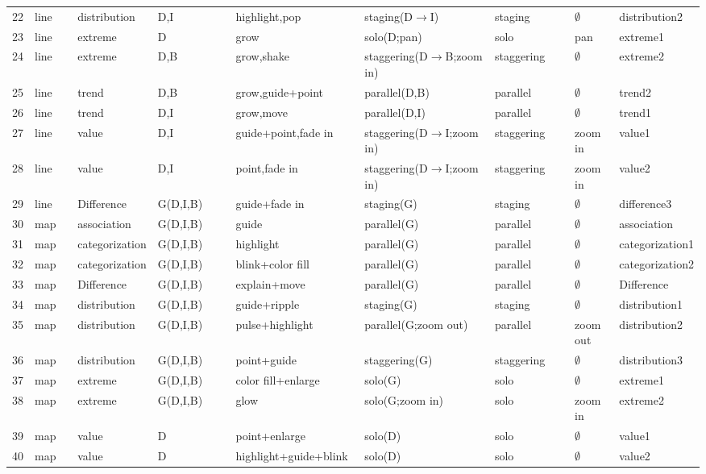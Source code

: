 \begin{landscape}
\begin{longtable}{p{0.035\linewidth}p{0.075\linewidth}p{0.09\linewidth}p{0.13\linewidth}p{0.19\linewidth}p{0.22\linewidth}p{0.13\linewidth}p{0.075\linewidth}p{0.08\linewidth}}
22 & line & distribution & D,I & highlight,pop & staging(D$\rightarrow$I) & staging & $\emptyset$ & distribution2 \\
23 & line & extreme & D & grow & solo(D;pan) & solo & pan & extreme1 \\
24 & line & extreme & D,B & grow,shake & staggering(D$\rightarrow$B;zoom in) & staggering & $\emptyset$ & extreme2 \\
25 & line & trend & D,B & grow,guide+point & parallel(D,B) & parallel & $\emptyset$ & trend2 \\
26 & line & trend & D,I & grow,move & parallel(D,I) & parallel & $\emptyset$ & trend1 \\
27 & line & value & D,I & guide+point,fade in & staggering(D$\rightarrow$I;zoom in) & staggering & zoom in & value1 \\
28 & line & value & D,I & point,fade in & staggering(D$\rightarrow$I;zoom in) & staggering & zoom in & value2 \\
29 & line & Difference & G(D,I,B) & guide+fade in & staging(G) & staging & $\emptyset$ & difference3 \\
30 & map & association & G(D,I,B) & guide & parallel(G) & parallel & $\emptyset$ & association \\
31 & map & categorization & G(D,I,B) & highlight & parallel(G) & parallel & $\emptyset$ & categorization1 \\
32 & map & categorization & G(D,I,B) & blink+color fill & parallel(G) & parallel & $\emptyset$ & categorization2 \\
33 & map & Difference & G(D,I,B) & explain+move & parallel(G) & parallel & $\emptyset$ & Difference \\
34 & map & distribution & G(D,I,B) & guide+ripple & staging(G) & staging & $\emptyset$ & distribution1 \\
35 & map & distribution & G(D,I,B) & pulse+highlight & parallel(G;zoom out) & parallel & zoom out & distribution2 \\
36 & map & distribution & G(D,I,B) & point+guide & staggering(G) & staggering & $\emptyset$ & distribution3 \\
37 & map & extreme & G(D,I,B) & color fill+enlarge & solo(G) & solo & $\emptyset$ & extreme1 \\
38 & map & extreme & G(D,I,B) & glow & solo(G;zoom in) & solo & zoom in & extreme2 \\
39 & map & value & D & point+enlarge & solo(D) & solo & $\emptyset$ & value1 \\
40 & map & value & D & highlight+guide+blink & solo(D) & solo & $\emptyset$ & value2 \\

\end{longtable}
\end{landscape}
